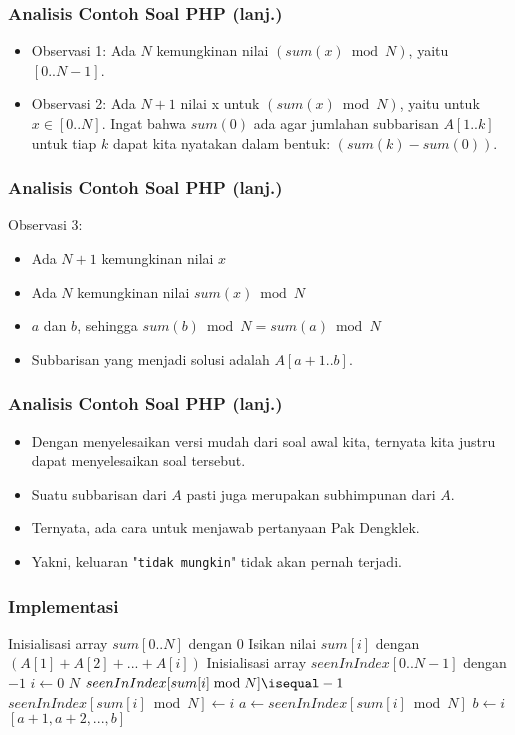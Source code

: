 \begin{frame}
\frametitle{Analisis Contoh Soal PHP (lanj.)}
\begin{itemize}
  \item Observasi 1: \newline
  Ada $N$ kemungkinan nilai $(sum(x) \bmod N)$, yaitu $[0..N-1]$.
  \item Observasi 2: \newline
  Ada $N+1$ nilai x untuk $(sum(x) \bmod N)$, yaitu untuk $x \in [0..N]$. \newline \newline
  Ingat bahwa $sum(0)$ ada agar jumlahan subbarisan $A[1..k]$ untuk tiap $k$ dapat kita nyatakan dalam bentuk: $(sum(k) - sum(0))$.
\end{itemize}
\end{frame}

\begin{frame}
\frametitle{Analisis Contoh Soal PHP (lanj.)}
Observasi 3:
\begin{itemize}
  \item Ada $N+1$ kemungkinan nilai $x$
  \item Ada $N$ kemungkinan nilai $sum(x) \bmod N$
  \item {} $a$ dan $b$, sehingga \newline $sum(b) \bmod N = sum(a) \bmod N$
  \item Subbarisan yang menjadi solusi adalah $A[a+1..b]$.
\end{itemize}
\end{frame}

\begin{frame}
\frametitle{Analisis Contoh Soal PHP (lanj.)}
\begin{itemize}
  \item Dengan menyelesaikan versi mudah dari soal awal kita, ternyata kita justru dapat menyelesaikan soal tersebut.
  \item Suatu subbarisan dari $A$ pasti juga merupakan subhimpunan dari $A$.
  \item Ternyata,  ada cara untuk menjawab pertanyaan Pak Dengklek.
  \item Yakni, keluaran "\texttt{tidak mungkin}" tidak akan pernah terjadi.
\end{itemize}
\end{frame}

\begin{frame}
\frametitle{Implementasi}
\begin{codebox}
\li \Comment Inisialisasi array $sum[0..N]$ dengan $0$
\li \Comment Isikan nilai $sum[i]$ dengan $(A[1] + A[2] + ... + A[i])$
\li \Comment Inisialisasi array $seenInIndex[0..N-1]$ dengan $-1$
\zi 
\li \For $i \gets 0$ \To $N$
    \Do
\li   \If $seenInIndex[sum[i] \bmod N] \isequal -1$
      \Then
\li     $seenInIndex[sum[i] \bmod N] \gets i$    
\li   \Else
\li     $a \gets seenInIndex[sum[i] \bmod N]$
\li     $b \gets i$
\li     \Return $[a+1, a+2, ..., b]$
      \End
    \End
\end{codebox}
\end{frame}


